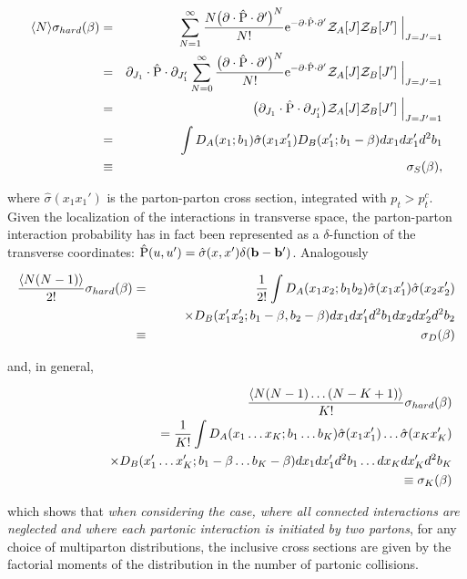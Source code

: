 \documentclass{ws-rv9x6}
\begin{document}
\begin{eqnarray}\label{sigmas}\langle N\rangle\sigma_{hard}(\beta)  &=&\sum_{N=1}^{\infty}{N\bigl(\partial\cdot\hat{\rm P}\cdot\partial'\bigr)^{N}\over{N !} } {\rm e}^{-\partial\cdot\hat{\rm P}\cdot\partial'}
  {\cal Z}_A[J]{\cal Z}_B[J']\Bigm|_{J=J'=1}\\
  &=&\partial_{J_1}\cdot\hat{\rm P}\cdot\partial_{J_1'}\sum_{N=0}^{\infty}{\bigl(\partial\cdot\hat{\rm P}\cdot\partial'\bigr)^{N}\over{N !} } {\rm e}^{-\partial\cdot\hat{\rm P}\cdot\partial'}
  {\cal Z}_A[J]{\cal Z}_B[J']\Bigm|_{J=J'=1}\cr
  &=&\bigl(\partial_{J_1}\cdot\hat{\rm P}\cdot\partial_{J_1'} \bigr){\cal Z}_A[J]{\cal Z}_B[J']\Bigm|_{J=J'=1}\cr
  &=&\int D_A(x_1;b_1)\hat{\sigma}(x_1x_1') D_B(x_1';b_1-\beta)dx_1dx_1'd^2b_1\cr
  &\equiv&\sigma_S(\beta),\nonumber
  \end{eqnarray}

  \noindent where $\hat{\sigma}(x_1x_1')$ is the parton-parton cross section, integrated with $p_t>p_t^c$. Given the localization of the interactions in transverse space,  the parton-parton interaction probability has in fact been represented as a $\delta$-function of the transverse coordinates: $\hat{\rm P}(u,u')=\hat{\sigma}(x, x')\delta({\bf b}-{\bf b}')$. Analogously 

\begin{eqnarray}\label{sigmad}{\langle N(N-1)\rangle\over2!}\sigma_{hard}(\beta)&=&{1\over2!}\int D_A(x_1x_2;b_1 b_2)\hat{\sigma}(x_1x_1')\hat{\sigma}(x_2x_2')\\&&\quad\quad\times   D_B(x_1' x_2';b_1-\beta, b_2-\beta)dx_1dx_1'd^2b_1 dx_2dx_2'd^2b_2\cr
&\equiv&\sigma_D(\beta)\nonumber
\end{eqnarray}

\noindent and, in general,

\begin{eqnarray}\label{sigmak}&&\!\!\!\!\!\!\!\!\!\!\!{\langle N(N-1)\dots(N-K+1)\rangle\over K!}\sigma_{hard}(\beta)\cr
  &&\qquad\qquad={1\over K!}\int D_A(x_1 \dots x_K;b_1 \dots b_K)\hat{\sigma}(x_1x_1')\dots\hat{\sigma}(x_Kx_K')\\
  &&\qquad\quad\qquad\quad\times  D_B(x_1' \dots x_K';b_1-\beta \dots b_K-\beta)dx_1dx_1'd^2b_1\dots dx_Kdx_K'd^2b_K \nonumber\\
&&\qquad\qquad\equiv\sigma_K(\beta)\nonumber
\end{eqnarray}

\noindent which shows that {\it when considering the case, where all connected interactions are neglected and where each partonic interaction is initiated by two partons}, for any choice of multiparton distributions, the
inclusive cross sections are given by the factorial moments of the
distribution in the number of partonic collisions. 
\end{document}
